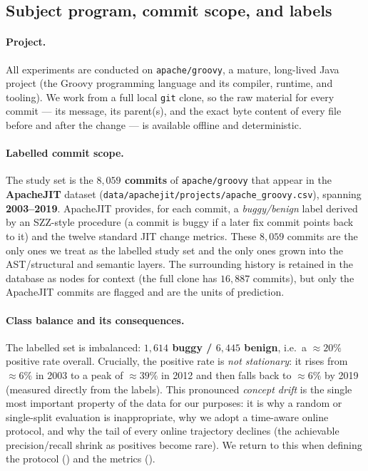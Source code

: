 	\subsection{Subject program, commit scope, and labels}
	\label{sec:setup-data}
	
	\paragraph{Project.} All experiments are conducted on \texttt{apache/groovy}, a
	mature, long-lived Java project (the Groovy programming language and its compiler,
	runtime, and tooling). We work from a full local \texttt{git} clone, so the raw
	material for every commit --- its message, its parent(s), and the exact byte content
	of every file before and after the change --- is available offline and deterministic.
	
	\paragraph{Labelled commit scope.} The study set is the \textbf{$8{,}059$ commits}
	of \texttt{apache/groovy} that appear in the \textbf{ApacheJIT} dataset
	(\texttt{data/apachejit/projects/apache\_groovy.csv}), spanning \textbf{2003--2019}.
	ApacheJIT provides, for each commit, a \emph{buggy/benign} label derived by an
	SZZ-style procedure (a commit is buggy if a later fix commit points back to it) and
	the twelve standard JIT change metrics. These $8{,}059$ commits are the only ones we
	treat as the labelled study set and the only ones grown into the AST/structural and
	semantic layers. The surrounding history is retained in the database as
	 nodes for context (the full clone has $16{,}887$ commits), but only the
	ApacheJIT commits are flagged  and are the units of prediction.
	
	\paragraph{Class balance and its consequences.} The labelled set is imbalanced:
	\textbf{$1{,}614$ buggy / $6{,}445$ benign}, i.e.\ a $\approx\!20\%$ positive rate
	overall. Crucially, the positive rate is \emph{not stationary}: it rises from
	$\approx\!6\%$ in 2003 to a peak of $\approx\!39\%$ in 2012 and then falls back to
	$\approx\!6\%$ by 2019 (measured directly from the labels). This pronounced
	\emph{concept drift} is the single most important property of the data for our
	purposes: it is why a random or single-split evaluation is inappropriate, why we
	adopt a time-aware online protocol, and why the tail of every online trajectory
	declines (the achievable precision/recall shrink as positives become rare). We
	return to this when defining the protocol () and the
	metrics ().
	
